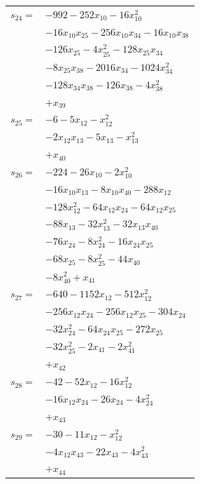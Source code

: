 \begin{longtable}{@{}r@{\;}l@{}}
\(s_{24}=\) & \(\displaystyle -992 -252x_{10} -16x_{10}^{2}\) \\
 & \(\displaystyle -16x_{10}x_{25} -256x_{10}x_{34} -16x_{10}x_{38}\) \\
 & \(\displaystyle -126x_{25} -4x_{25}^{2} -128x_{25}x_{34}\) \\
 & \(\displaystyle -8x_{25}x_{38} -2016x_{34} -1024x_{34}^{2}\) \\
 & \(\displaystyle -128x_{34}x_{38} -126x_{38} -4x_{38}^{2}\) \\
 & \(\displaystyle +x_{39}\) \\[3pt]
\(s_{25}=\) & \(\displaystyle -6 -5x_{12} -x_{12}^{2}\) \\
 & \(\displaystyle -2x_{12}x_{13} -5x_{13} -x_{13}^{2}\) \\
 & \(\displaystyle +x_{40}\) \\[3pt]
\(s_{26}=\) & \(\displaystyle -224 -26x_{10} -2x_{10}^{2}\) \\
 & \(\displaystyle -16x_{10}x_{13} -8x_{10}x_{40} -288x_{12}\) \\
 & \(\displaystyle -128x_{12}^{2} -64x_{12}x_{24} -64x_{12}x_{25}\) \\
 & \(\displaystyle -88x_{13} -32x_{13}^{2} -32x_{13}x_{40}\) \\
 & \(\displaystyle -76x_{24} -8x_{24}^{2} -16x_{24}x_{25}\) \\
 & \(\displaystyle -68x_{25} -8x_{25}^{2} -44x_{40}\) \\
 & \(\displaystyle -8x_{40}^{2} +x_{41}\) \\[3pt]
\(s_{27}=\) & \(\displaystyle -640 -1152x_{12} -512x_{12}^{2}\) \\
 & \(\displaystyle -256x_{12}x_{24} -256x_{12}x_{25} -304x_{24}\) \\
 & \(\displaystyle -32x_{24}^{2} -64x_{24}x_{25} -272x_{25}\) \\
 & \(\displaystyle -32x_{25}^{2} -2x_{41} -2x_{41}^{2}\) \\
 & \(\displaystyle +x_{42}\) \\[3pt]
\(s_{28}=\) & \(\displaystyle -42 -52x_{12} -16x_{12}^{2}\) \\
 & \(\displaystyle -16x_{12}x_{24} -26x_{24} -4x_{24}^{2}\) \\
 & \(\displaystyle +x_{43}\) \\[3pt]
\(s_{29}=\) & \(\displaystyle -30 -11x_{12} -x_{12}^{2}\) \\
 & \(\displaystyle -4x_{12}x_{43} -22x_{43} -4x_{43}^{2}\) \\
 & \(\displaystyle +x_{44}\) \\[3pt]

\end{longtable}
